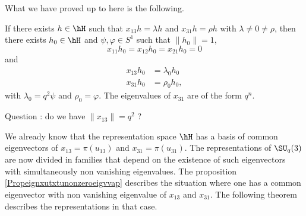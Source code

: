 What we have proved up to here is the following.
\begin{proposition}     \label{Propeignxutxtunonzeroeigvvap}
    If there exists \( h\in\hH\) such that \( x_{13}h=\lambda h\) and \( x_{31}h=\rho h\) with \( \lambda\neq 0\neq \rho\), then there exists \( h_0\in\hH\) and \( \psi,\varphi\in S^1\) such that \( \| h_0\|=1 \),
    \begin{equation}
        x_{11}h_0=x_{12}h_0=x_{21}h_0=0
    \end{equation}
    and
    \begin{subequations}
        \begin{align}
            x_{13}h_0&=\lambda_0h_0\\
            x_{31}h_0&=\rho_0 h_0,
        \end{align}
    \end{subequations}
    with \( \lambda_0=q^2\psi\) and \( \rho_0=\varphi\). The eigenvalues of \( x_{31}\) are of the form \( q^n\).
\end{proposition}

\begin{probleme}
    Question : do we have \( \| x_{13} \|=q^2\) ?
\end{probleme}

We already know that the representation space \( \hH\) has a basis of common eigenvectors of \( x_{13}=\pi(u_{13})\) and \( x_{31}=\pi(u_{31})\). The representations of \( \SU_q(3)\) are now divided in families that depend on the existence of such eigenvectors with simultaneously non vanishing eigenvalues. The proposition \ref{Propeignxutxtunonzeroeigvvap} describes the situation where one has a common eigenvector with non vanishing eigenvalue of \( x_{13}\) and \( x_{31}\). The following theorem describes the representations in that case.

